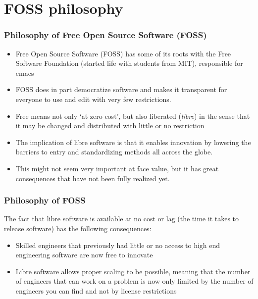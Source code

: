 \documentclass{beamer}
\begin{document}
\section{FOSS philosophy}


\begin{frame}
\frametitle{Philosophy of Free Open Source Software (FOSS)}

\begin{itemize}
\item Free Open Source Software (FOSS) has some of its roots with the Free Software Foundation (started life with students from MIT), responsible for emacs

\item FOSS does in part democratize software and makes it transparent for everyone to use and edit with very few restrictions.
        
\item Free means not only `at zero cost', but also liberated (\emph{libre}) in the sense that it may be changed and distributed with little or no restriction
        
\item The implication of libre software is that it enables innovation by lowering the barriers to entry and standardizing methods all across the globe.
        
\item This might not seem very important at face value, but it has great consequences that have not been fully realized yet.
                
\end{itemize}


\end{frame}


\begin{frame}
\frametitle{Philosophy of FOSS}

The fact that libre software is available at no cost or lag (the time it takes to release software) has the following consequences:

\begin{itemize}
\item Skilled engineers that previously had little or no access to high end engineering software are now free to innovate
\item Libre software allows proper scaling to be possible, meaning that the number of engineers that can work on a problem is now only limited by the number of engineers you can find and not by license restrictions
\end{itemize}

\end{frame}
\end{document}
